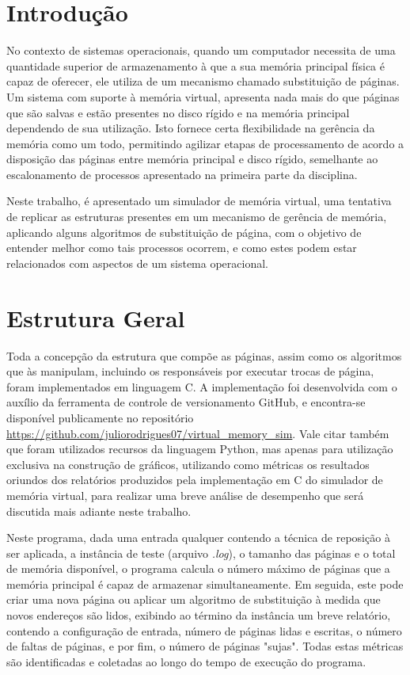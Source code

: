\documentclass[a4paper, 12pt]{article}
\begin{document}
\tableofcontents
\newpage
\section{Introdução}

No contexto de sistemas operacionais, quando um computador necessita de uma quantidade superior de armazenamento à que a sua memória principal física é capaz de oferecer, ele utiliza de um mecanismo chamado substituição de páginas. Um sistema com suporte à memória virtual, apresenta nada mais do que páginas que são salvas e estão presentes no disco rígido e na memória principal dependendo de sua utilização. Isto fornece certa flexibilidade na gerência da memória como um todo, permitindo agilizar etapas de processamento de acordo a disposição das páginas entre memória principal e disco rígido, semelhante ao escalonamento de processos apresentado na primeira parte da disciplina.

Neste trabalho, é apresentado um simulador de memória virtual, uma tentativa de replicar as estruturas presentes em um mecanismo de gerência de memória, aplicando alguns algoritmos de substituição de página, com o objetivo de entender melhor como tais processos ocorrem, e como estes podem estar relacionados com aspectos de um sistema operacional.

\section{Estrutura Geral}

Toda a concepção da estrutura que compõe as páginas, assim como os algoritmos que às manipulam, incluindo os responsáveis por executar trocas de página, foram implementados em linguagem C. A implementação foi desenvolvida com o auxílio da ferramenta de controle de versionamento GitHub, e encontra-se disponível publicamente no repositório \url{https://github.com/juliorodrigues07/virtual_memory_sim}. Vale citar também que foram utilizados recursos da linguagem Python, mas apenas para utilização exclusiva na construção de gráficos, utilizando como métricas os resultados oriundos dos relatórios produzidos pela implementação em C do simulador de memória virtual, para realizar uma breve análise de desempenho que será discutida mais adiante neste trabalho.

Neste programa, dada uma entrada qualquer contendo a técnica de reposição à ser aplicada, a instância de teste (arquivo \emph{.log}), o tamanho das páginas e o total de memória disponível, o programa calcula o número máximo de páginas que a memória principal é capaz de armazenar simultaneamente. Em seguida, este pode criar uma nova página ou aplicar um algoritmo de substituição à medida que novos endereços são lidos, exibindo ao término da instância um breve relatório, contendo a configuração de entrada, número de páginas lidas e escritas, o número de faltas de páginas, e por fim, o número de páginas "sujas". Todas estas métricas são identificadas e coletadas ao longo do tempo de execução do programa.
\end{document}
